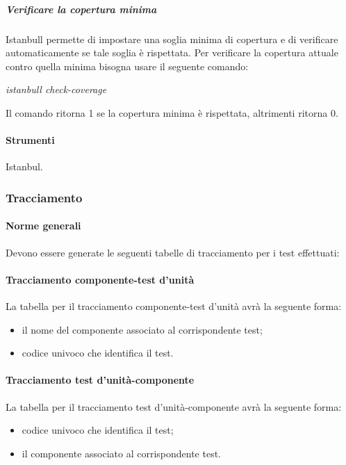 \subparagraph{Verificare la copertura minima}
Istanbull permette di impostare una soglia minima di copertura e di verificare automaticamente se tale soglia è rispettata.
Per verificare la copertura attuale contro quella minima bisogna usare il seguente comando:\\
\begin{center}
\textit{istanbull check-coverage}\\
\end{center}
Il comando ritorna 1 se la copertura minima è rispettata, altrimenti ritorna 0.


\paragraph{Strumenti}
Istanbul.


\subsubsection{Tracciamento}

\paragraph{Norme generali}
Devono essere generate le seguenti tabelle di tracciamento per i test effettuati:

\paragraph{Tracciamento componente-test d'unità}
La tabella per il tracciamento componente-test d'unità avrà la seguente forma:
\begin{itemize}
\item {} il nome del componente associato al corrispondente test;
\item {}codice univoco che identifica il test.
\end{itemize}

\paragraph{Tracciamento test d'unità-componente}
La tabella per il tracciamento test d'unità-componente avrà la seguente forma:
\begin{itemize}
\item {}codice univoco che identifica il test;
\item {} il componente associato al corrispondente test.
\end{itemize}



